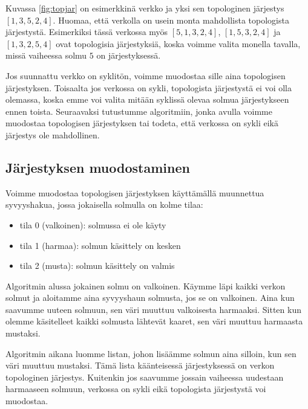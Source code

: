Kuvassa \ref{fig:topjar} on esimerkkinä verkko ja yksi sen topologinen
järjestys $[1,3,5,2,4]$.
Huomaa, että verkolla on usein monta mahdollista
topologista järjestystä.
Esimerkiksi tässä verkossa myös $[5,1,3,2,4]$,
$[1,5,3,2,4]$ ja $[1,3,2,5,4]$
ovat topologisia järjestyksiä, koska voimme valita monella tavalla,
missä vaiheessa solmu $5$ on järjestyksessä.

Jos suunnattu verkko on syklitön, voimme muodostaa sille
aina topologisen järjestyksen.
Toisaalta jos verkossa on sykli,
topologista järjestystä ei voi olla olemassa,
koska emme voi valita mitään syklissä olevaa solmua
järjestykseen ennen toista.
Seuraavaksi tutustumme algoritmiin,
jonka avulla voimme muodostaa topologisen järjestyksen
tai todeta, että verkossa on sykli eikä järjestys ole mahdollinen.

\subsection{Järjestyksen muodostaminen}

Voimme muodostaa topologisen järjestyksen käyttämällä
muunnettua syvyyshakua, jossa jokaisella solmulla on kolme tilaa:

\begin{itemize}
\item tila 0 (valkoinen): solmussa ei ole käyty
\item tila 1 (harmaa): solmun käsittely on kesken
\item tila 2 (musta): solmun käsittely on valmis
\end{itemize}

Algoritmin alussa jokainen solmu on valkoinen.
Käymme läpi kaikki verkon solmut ja aloitamme aina syvyyshaun
solmusta, jos se on valkoinen.
Aina kun saavumme uuteen solmuun, sen väri muuttuu
valkoisesta harmaaksi.
Sitten kun olemme käsitelleet kaikki solmusta lähtevät
kaaret, sen väri muuttuu harmaasta mustaksi.

Algoritmin aikana luomme listan, johon lisäämme solmun
aina silloin, kun sen väri muuttuu mustaksi.
Tämä lista käänteisessä järjestyksessä on verkon
topologinen järjestys.
Kuitenkin jos saavumme jossain vaiheessa uudestaan harmaaseen solmuun,
verkossa on sykli eikä topologista järjestystä voi muodostaa.

